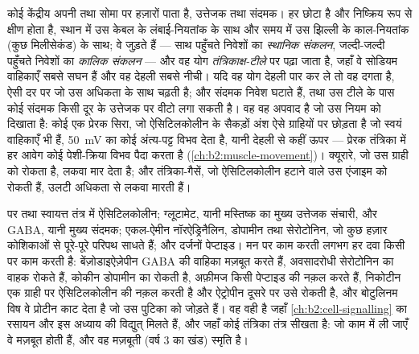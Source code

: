 \begin{proposition}[समाकलन: किसी निर्णय के रूप में न्यूरॉन]\label{prop:b2:neurons-synapses:integration}
कोई केंद्रीय  अपनी  तथा सोमा पर हज़ारों  पाता है,
उत्तेजक तथा संदमक। हर 
छोटा है और निष्क्रिय रूप से क्षीण होता है, स्थान में उस केबल के लंबाई-नियतांक के साथ
और समय में उस झिल्ली के काल-नियतांक (कुछ मिलीसेकंड) के साथ;
वे जुड़ते हैं --- साथ पहुँचते निवेशों का \emph{स्थानिक संकलन},
जल्दी-जल्दी पहुँचते निवेशों का \emph{कालिक संकलन} --- और वह योग
\emph{तंत्रिकाक्ष-टीले} पर पढ़ा जाता है, जहाँ
वे सोडियम वाहिकाएँ सबसे सघन हैं और वह देहली सबसे नीची। यदि वह
योग देहली पार कर ले तो वह  दगता है, ऐसी दर पर जो उस अधिकता के साथ
चढ़ती है; और संदमक निवेश घटाते हैं, तथा उस टीले के पास कोई संदमक 
किसी दूर के उत्तेजक पर वीटो लगा सकती है। वह
 वह अपवाद है जो उस नियम को दिखाता है: कोई एक
प्रेरक सिरा, जो ऐसिटिलकोलीन के सैकड़ों अंश ऐसे ग्राहियों पर छोड़ता है
जो स्वयं वाहिकाएँ भी हैं, \qty{50}{mV} का कोई अंत्य-पट्ट विभव
देता है, यानी देहली से कहीं ऊपर --- प्रेरक तंत्रिका में हर आवेग
कोई पेशी-क्रिया विभव पैदा करता है
(\cref{ch:b2:muscle-movement})। क्यूरारे, जो उस ग्राही को रोकता है,
लकवा मार देता है; और तंत्रिका-गैसें, जो ऐसिटिलकोलीन हटाने वाले उस एंजाइम को
रोकती हैं, उलटी अधिकता से लकवा मारती हैं।
\end{proposition}

\begin{example}[संचारी और दवाएँ]\label{ex:b2:neurons-synapses:transmitters}
 पर तथा स्वायत्त तंत्र में
ऐसिटिलकोलीन; ग्लूटामेट, यानी मस्तिष्क का मुख्य उत्तेजक संचारी,
और GABA, यानी मुख्य संदमक; एकल-ऐमीन नॉरऐड्रिनैलिन,
डोपामीन तथा सेरोटोनिन, जो कुछ हज़ार कोशिकाओं से पूरे-पूरे परिपथ
साधते हैं; और दर्जनों पेप्टाइड। मन पर काम करती लगभग हर दवा
किसी  पर काम करती है: बेंज़ोडाइऐज़ेपीन GABA की
वाहिका मज़बूत करते हैं, अवसादरोधी सेरोटोनिन का वाहक रोकते हैं, कोकीन
डोपामीन का रोकती है, अफ़ीमज किसी पेप्टाइड की नक़ल करते हैं, निकोटीन
एक ग्राही पर ऐसिटिलकोलीन की नक़ल करती है और ऐट्रोपीन दूसरे पर उसे रोकती है,
और बोटुलिनम विष वे प्रोटीन काट देता है जो उस पुटिका को जोड़ते हैं। वह 
वही है जहाँ \cref{ch:b2:cell-signalling} का रसायन और
इस अध्याय की विद्युत् मिलते हैं, और जहाँ कोई तंत्रिका तंत्र सीखता है:
जो  काम में ली जाएँ वे मज़बूत होती हैं, और वह मज़बूती (वर्ष 3
का खंड) स्मृति है।
\end{example}

